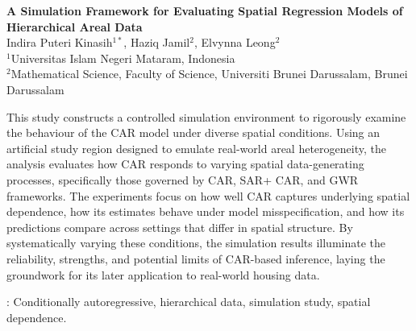 \documentclass[a4paper,reqno]{amsart}
\begin{document}
\begin{center}
{\Large{\bf A Simulation Framework for Evaluating Spatial Regression Models of Hierarchical Areal Data}\\ %
\vspace{1.5cc}
{\large Indira Puteri Kinasih$^{1\ast}$, Haziq Jamil$^{2}$, Elvynna Leong$^{2}$}\\ %
\vspace{0.3 cm} {\small $^{1}$Universitas Islam Negeri Mataram, Indonesia\\
$^{2}$Mathematical Science, Faculty of Science, Universiti Brunei Darussalam, Brunei Darussalam}

\rule{0mm}{6mm}
\begin{NoHyper}
\renewcommand{\thefootnote}{}
\end{NoHyper}
}

\vspace{1.5cc}

\parbox{24cc}{{
This study constructs a controlled simulation environment to rigorously examine the behaviour of the CAR model under diverse spatial conditions. Using an artificial study region designed to emulate real-world areal heterogeneity, the analysis evaluates how CAR responds to varying spatial data-generating processes, specifically those governed by CAR, SAR+ CAR, and GWR frameworks. The experiments focus on how well CAR captures underlying spatial dependence, how its estimates behave under model misspecification, and how its predictions compare across settings that differ in spatial structure. By systematically varying these conditions, the simulation results illuminate the reliability, strengths, and potential limits of CAR-based inference, laying the groundwork for its later application to real-world housing data.
}}
\end{center}

\vspace{0.25cc}
\parbox{24cc}{: Conditionally autoregressive, hierarchical data, simulation study, spatial dependence. \\%
}
\end{document}
